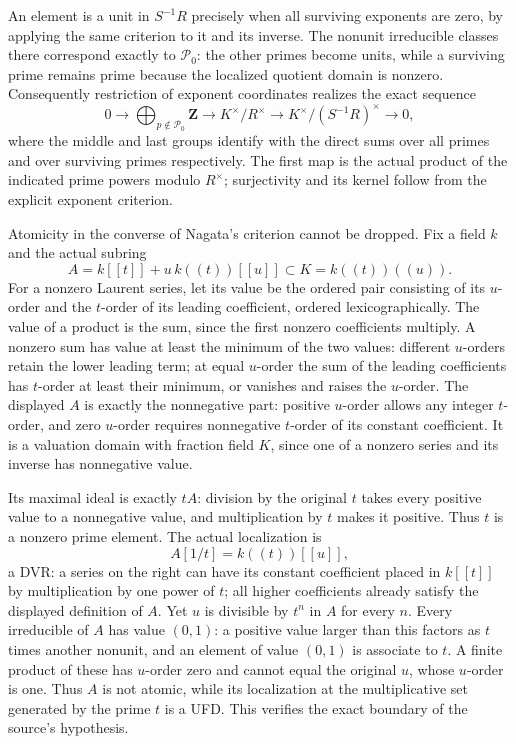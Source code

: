 An element is a unit in \(S^{-1}R\) precisely when all surviving exponents are zero, by applying the same criterion to it and its inverse. The nonunit irreducible classes there correspond exactly to \(\mathcal P_0\): the other primes become units, while a surviving prime remains prime because the localized quotient domain is nonzero. Consequently restriction of exponent coordinates realizes the exact sequence \[
 0\longrightarrow\bigoplus_{p\notin\mathcal P_0}\mathbf Z
 \longrightarrow K^\times/R^\times
 \longrightarrow K^\times/(S^{-1}R)^\times
 \longrightarrow0,
\] where the middle and last groups identify with the direct sums over all primes and over surviving primes respectively. The first map is the actual product of the indicated prime powers modulo \(R^\times\); surjectivity and its kernel follow from the explicit exponent criterion.

Atomicity in the converse of Nagata's criterion cannot be dropped. Fix a field \(k\) and the actual subring \[
 A=k[[t]]+u\,k((t))[[u]]
 \subset K=k((t))((u)).
\] For a nonzero Laurent series, let its value be the ordered pair consisting of its \(u\)-order and the \(t\)-order of its leading coefficient, ordered lexicographically. The value of a product is the sum, since the first nonzero coefficients multiply. A nonzero sum has value at least the minimum of the two values: different \(u\)-orders retain the lower leading term; at equal \(u\)-order the sum of the leading coefficients has \(t\)-order at least their minimum, or vanishes and raises the \(u\)-order. The displayed \(A\) is exactly the nonnegative part: positive \(u\)-order allows any integer \(t\)-order, and zero \(u\)-order requires nonnegative \(t\)-order of its constant coefficient. It is a valuation domain with fraction field \(K\), since one of a nonzero series and its inverse has nonnegative value.

Its maximal ideal is exactly \(tA\): division by the original \(t\) takes every positive value to a nonnegative value, and multiplication by \(t\) makes it positive. Thus \(t\) is a nonzero prime element. The actual localization is \[
 A[1/t]=k((t))[[u]],
\] a DVR: a series on the right can have its constant coefficient placed in \(k[[t]]\) by multiplication by one power of \(t\); all higher coefficients already satisfy the displayed definition of \(A\). Yet \(u\) is divisible by \(t^n\) in \(A\) for every \(n\). Every irreducible of \(A\) has value \((0,1)\): a positive value larger than this factors as \(t\) times another nonunit, and an element of value \((0,1)\) is associate to \(t\). A finite product of these has \(u\)-order zero and cannot equal the original \(u\), whose \(u\)-order is one. Thus \(A\) is not atomic, while its localization at the multiplicative set generated by the prime \(t\) is a UFD. This verifies the exact boundary of the source's hypothesis.

